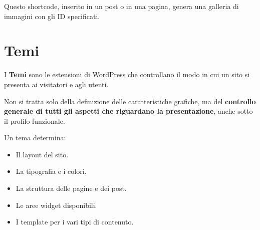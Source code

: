 Questo shortcode, inserito in un post o in una pagina, genera una galleria di immagini con gli ID specificati.

\section{Temi}

I \textbf{Temi} sono le estensioni di WordPress che controllano il modo in cui un sito si presenta ai visitatori e agli utenti.

Non si tratta solo della definizione delle caratteristiche grafiche, ma del \textbf{controllo generale di tutti gli aspetti che riguardano la presentazione}, anche sotto il profilo funzionale.

Un tema determina:

\begin{itemize}
    \item Il layout del sito.
    \item La tipografia e i colori.
    \item La struttura delle pagine e dei post.
    \item Le aree widget disponibili.
    \item I template per i vari tipi di contenuto.
\end{itemize}
